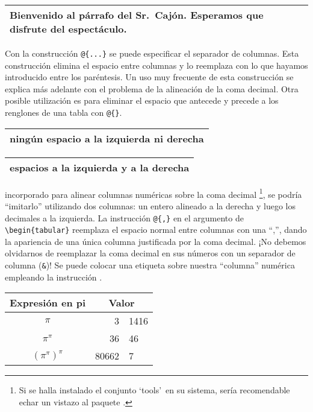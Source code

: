 \begin{example}
\begin{tabular}{|p{4.7cm}|}
\hline
Bienvenido al párrafo del Sr.\
Cajón. Esperamos que disfrute
del espectáculo.\\
\hline
\end{tabular}

\end{example}

Con la construcción \verb|@{...}| se puede especificar el separador de
columnas. Esta  construcción elimina  el espacio  entre columnas  y lo
reemplaza con lo que hayamos  introducido entre los paréntesis. Un uso
muy  frecuente de  esta construcción  se explica  más adelante  con el
problema de la alineación de la coma decimal. Otra posible utilización
es para eliminar el espacio que  antecede y precede a los renglones de
una tabla con \verb|@{}|.

\begin{example}
\begin{tabular}{@{} l @{}}
\hline
ningún espacio a la izquierda
ni derecha\\\hline
\end{tabular}
\end{example}
\begin{example}
\begin{tabular}{l}
\hline
espacios a la izquierda
y a la derecha\\
\hline
\end{tabular}
\end{example}

incorporado  para alinear  columnas  numéricas sobre  la coma  decimal
\footnote{Si se  halla instalado el  conjunto `tools'\ en  su sistema,
sería  recomendable echar  un vistazo  al paquete  \pai{dcolumn}.}, se
podría  ``imitarlo'' utilizando  dos  columnas: un  entero alineado  a
la  derecha y  luego  los  decimales a  la  izquierda. La  instrucción
\verb|@{,}|  en el  argumento de  \verb|\begin{tabular}| reemplaza  el
espacio  normal entre  columnas  con una  ``,'',  dando la  apariencia
de  una   única  columna  justificada   por  la  coma   decimal.  ¡No
debemos  olvidarnos  de reemplazar  la  coma  decimal en  sus  números
con  un  separador  de  columna   (\verb|&|)!  Se  puede  colocar  una
etiqueta sobre  nuestra ``columna'' numérica empleando  la instrucción
\ci{multicolumn}.

\begin{example}  
\begin{tabular}{cr@{,}l}
Expresión  en  pi  & \multicolumn{2}{c}{Valor} \\  
\hline 
$\pi$  & 3&1416 \\  
$\pi^{\pi}$ &
36&46 \\ 
$(\pi^{\pi})^{\pi}$ & 80662&7 
\\ \end{tabular} 
\end{example}

